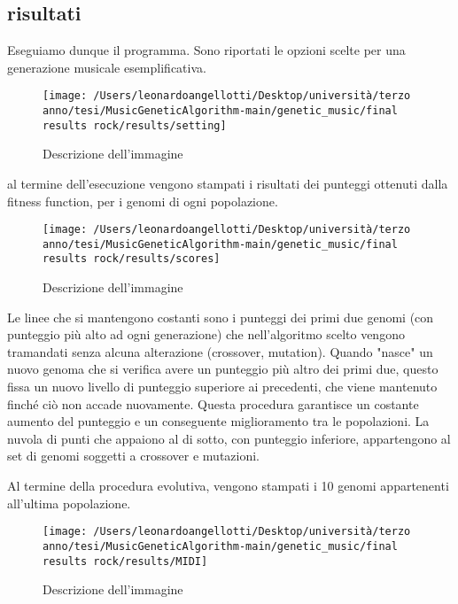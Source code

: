 \documentclass[a4paper,12pt]{report}
\begin{document}
\subsection{risultati}

Eseguiamo dunque il programma.
Sono riportati le opzioni scelte per una generazione musicale esemplificativa.

\begin{figure}[h!]
    \centering
    \texttt{[image: /Users/leonardoangellotti/Desktop/università/terzo anno/tesi/MusicGeneticAlgorithm-main/genetic\_music/final results rock/results/setting]} 
    \caption{Descrizione dell'immagine}
    \label{fig:immagine}
\end{figure}

al termine dell'esecuzione vengono stampati i risultati dei punteggi ottenuti dalla fitness function, per i genomi di ogni popolazione.

\begin{figure}[h!]
    \centering
    \texttt{[image: /Users/leonardoangellotti/Desktop/università/terzo anno/tesi/MusicGeneticAlgorithm-main/genetic\_music/final results rock/results/scores]} 
    \caption{Descrizione dell'immagine}
    \label{fig:immagine}
\end{figure}

Le linee che si mantengono costanti sono i punteggi dei primi due genomi (con punteggio più alto ad ogni generazione) che nell'algoritmo scelto vengono tramandati senza alcuna alterazione (crossover, mutation).
Quando "nasce" un nuovo genoma che si verifica avere un punteggio più altro dei primi due, questo fissa un nuovo livello di punteggio superiore ai precedenti, che viene mantenuto finché ciò non accade nuovamente.
Questa procedura garantisce un costante aumento del punteggio e un conseguente miglioramento tra le popolazioni.
La nuvola di punti che appaiono al di sotto, con punteggio inferiore, appartengono al set di genomi soggetti a crossover e mutazioni.

Al termine della procedura evolutiva, vengono stampati i 10 genomi appartenenti all'ultima popolazione.

\begin{figure}[h!]
    \centering
    \texttt{[image: /Users/leonardoangellotti/Desktop/università/terzo anno/tesi/MusicGeneticAlgorithm-main/genetic\_music/final results rock/results/MIDI]} 
    \caption{Descrizione dell'immagine}
    \label{fig:immagine}
\end{figure}
\end{document}
